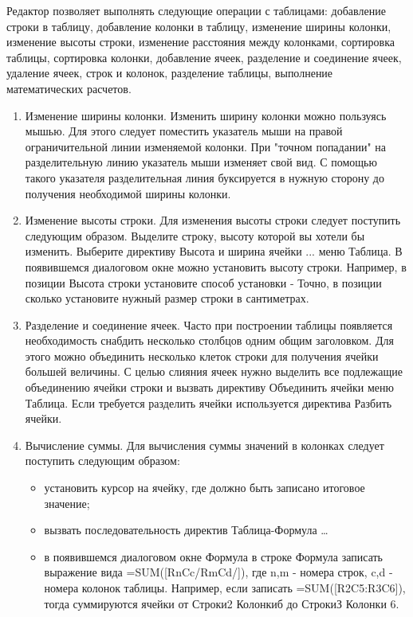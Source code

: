 \documentclass[a4paper]{article}
\begin{document}
Редактор позволяет выполнять следующие операции с таблицами: добавление строки в таблицу, добавление колонки в таблицу, изменение ширины колонки, изменение высоты строки, изменение расстояния между колонками, сортировка таблицы, сортировка колонки, добавление ячеек, разделение и соединение ячеек, удаление ячеек, строк и колонок, разделение таблицы, выполнение математических расчетов.
\begin{enumerate}
  \item Изменение ширины колонки.
        Изменить ширину колонки можно пользуясь мышью. Для этого следует поместить указатель мыши на правой ограничительной линии изменяемой колонки. При "точном попадании" на разделительную линию указатель мыши изменяет свой вид. С помощью такого указателя разделительная линия буксируется в нужную сторону до получения необходимой ширины колонки.
  \item Изменение высоты строки.
        Для изменения высоты строки следует поступить следующим образом. Выделите строку, высоту которой вы хотели бы изменить. Выберите директиву Высота и ширина ячейки ... меню Таблица. В появившемся диалоговом окне можно установить высоту строки. Например, в позиции Высота строки установите способ установки - Точно, в позиции сколько установите нужный размер строки в сантиметрах.
  \item Разделение и соединение ячеек.
        Часто при построении таблицы появляется необходимость снабдить несколько столбцов одним общим заголовком. Для этого можно объединить несколько клеток строки для получения ячейки большей величины. С целью слияния ячеек нужно выделить все подлежащие объединению ячейки строки и вызвать директиву Объединить ячейки меню Таблица. Если требуется разделить ячейки используется директива Разбить ячейки.
  \item Вычисление суммы.
        Для вычисления суммы значений в колонках следует поступить следующим образом:
        \begin{itemize}
          \item установить курсор на ячейку, где должно быть записано итоговое значение;
          \item вызвать последовательность директив Таблица-Формула \dots
          \item  в появившемся диалоговом окне Формула в строке Формула записать выражение вида =SUM([RnCc/RmCd/]), где n,m - номера строк, c,d - номера колонок таблицы. Например, если записать =SUM([R2C5:R3C6]), тогда суммируются ячейки от Строки2 Колонкиб до СтрокиЗ Колонки 6.
        \end{itemize}
\end{enumerate}
\end{document}
